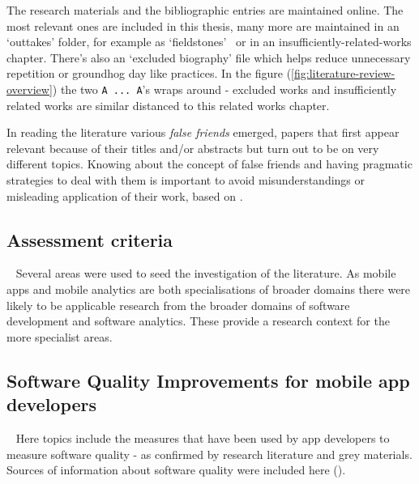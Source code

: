 The research materials and the bibliographic entries are maintained online. The most relevant ones are included in this thesis, many more are maintained in an `outtakes' folder, for example as `fieldstones'~ or in an insufficiently-related-works chapter. There's also an `excluded biography' file which helps reduce unnecessary repetition or groundhog day like practices. In the figure (\ref{fig:literature-review-overview}) the two \texttt{A ... A}'s wraps around - excluded works and insufficiently related works are similar distanced to this related works chapter.

In reading the literature various \textit{false friends} emerged, papers that first appear relevant because of their titles and/or abstracts but turn out to be on very different topics. 
Knowing about the concept of false friends and having pragmatic strategies to deal with them is important to avoid misunderstandings or misleading application of their work, 
based on . 

\subsection{Assessment criteria}~\label{rw-assessment-criteria-topic}
Several areas were used to seed the investigation of the literature. As mobile apps and mobile analytics are both specialisations of broader domains there were likely to be applicable research from the broader domains of software development and software analytics. These provide a research context for the more specialist areas.

\subsection{Software Quality Improvements for mobile app developers}~\label{rw-software-quality-improvements-for-mobile-app-devs-topic}
Here topics include the measures that have been used by app developers to measure software quality - as confirmed by research literature and grey materials. Sources of information about software quality were included here  ().

